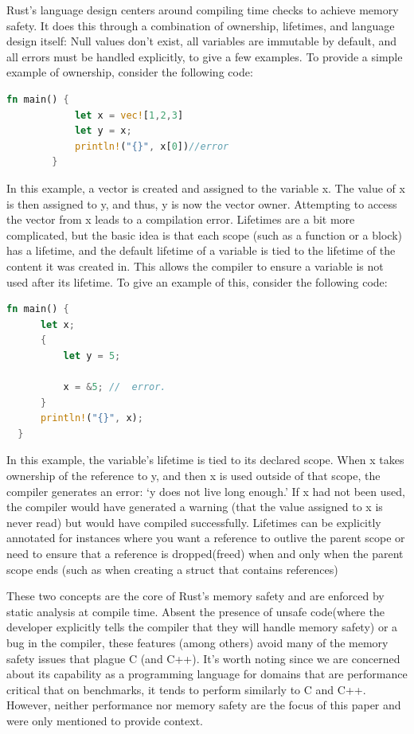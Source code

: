 \documentclass[conference]{IEEEtran}
\begin{document}
Rust's language design centers around compiling time checks to achieve memory safety. It does this through a combination of ownership, lifetimes, and language design itself:
Null values don't exist, all variables are immutable by default, and all errors must be handled explicitly, to give a few examples. To provide a simple example of ownership, consider the following code:
\begin{lstlisting}[language=Rust]
    fn main() {
            let x = vec![1,2,3]
            let y = x;
            println!("{}", x[0])//error 
        }
    \end{lstlisting}
In this example, a vector is created and assigned to the variable x. The value of x is then assigned to y, and thus, y is now the vector owner. Attempting to access the vector from x leads to a compilation error. Lifetimes are a bit more complicated, but the basic idea is that each scope (such as a function or a block) has a lifetime, and the default lifetime of a variable is tied to the lifetime of the content it was created in. This allows the compiler to ensure a variable is not used after its lifetime. To give an example of this, consider the following code:
\begin{lstlisting}[language=Rust]
  fn main() {
      let x;                                       
      {                         
          let y = 5;           

          x = &5; //  error.
      }                    
      println!("{}", x);       
  }                             
   \end{lstlisting}

In this example, the variable's lifetime is tied to its declared scope. When x takes ownership of the reference to y, and then x is used outside of that scope, the compiler generates an error: `y does not live long enough.' If x had not been used, the compiler would have generated a warning (that the value assigned to x is never read) but would have compiled successfully. Lifetimes can be explicitly annotated for instances where you want a reference to outlive the parent scope or need to ensure that a reference is dropped(freed) when and only when the parent scope ends (such as when creating a struct that contains references)

These two concepts are the core of Rust's memory safety and are enforced by static analysis at compile time. Absent the presence of unsafe code(where the developer explicitly tells the compiler that they will handle memory safety) or a bug in the compiler, these features (among others) avoid many of the memory safety issues that plague C (and C++). It's worth noting since we are concerned about its capability as a programming language for domains that are performance critical that on benchmarks, it tends to perform similarly to C and C++\cite{costanzoPerformanceVsProgramming2021}. However, neither performance nor memory safety are the focus of this paper and were only mentioned to provide context.
\end{document}
